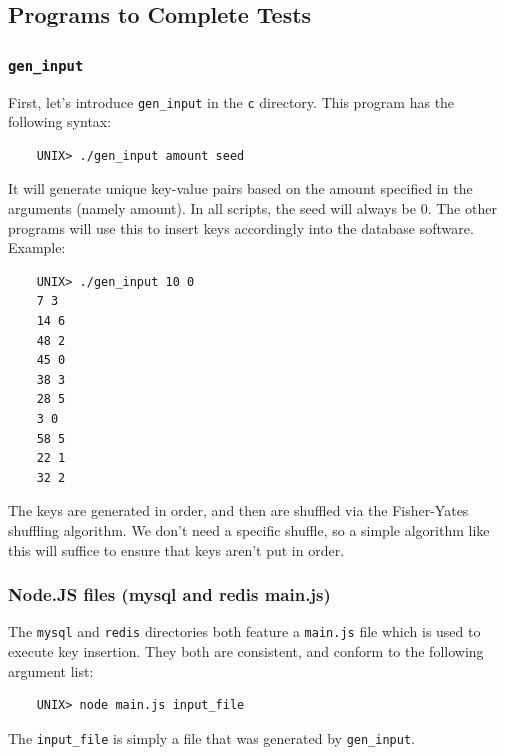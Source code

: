 \documentclass[letterpaper, 10 pt, conference]{ieeeconf}
\begin{document}
\subsection{Programs to Complete Tests}
\subsubsection{\texttt{gen\_input}}
First, let's introduce \texttt{gen\_input} in the \texttt{c} directory. This program has the following syntax:
\begin{verbatim}
    UNIX> ./gen_input amount seed
\end{verbatim}
It will generate unique key-value pairs based on the amount specified in the arguments (namely amount). In all scripts, the seed will always be 0. The other programs will use this to insert keys accordingly into the database software.
Example:
\begin{verbatim}
    UNIX> ./gen_input 10 0
    7 3
    14 6
    48 2
    45 0
    38 3
    28 5
    3 0
    58 5
    22 1
    32 2
\end{verbatim}
The keys are generated in order, and then are shuffled via the Fisher-Yates shuffling algorithm. We don't need a specific shuffle, so a simple algorithm like this will suffice to ensure that keys aren't put in order.\\
\subsubsection{Node.JS files (mysql and redis main.js)}
The \texttt{mysql} and \texttt{redis} directories both feature a \texttt{main.js} file which is used to execute key insertion. They both are consistent, and conform to the following argument list:
\begin{verbatim}
    UNIX> node main.js input_file
\end{verbatim}
The \texttt{input\_file} is simply a file that was generated by \texttt{gen\_input}. \\
\end{document}
